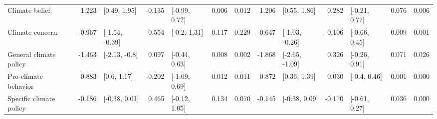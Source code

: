 \documentclass[
  letterpaper,
  DIV=11,
  numbers=noendperiod]{scrartcl}
\begin{document}
\begin{table}
{\begin{tabular*}{\linewidth}{@{\extracolsep{\fill}}lrlrlrrrlrlrr}
\midrule\addlinespace[2.5pt]
\multicolumn{13}{l}{{\bfseries Tertiary}} \\[2.5pt] 
\midrule\addlinespace[2.5pt]
Climate belief & 1.223 & [0.49, 1.95] & -0.135 & [-0.99, 0.72] & 0.006 & 0.012 & 1.206 & [0.55, 1.86] & 0.282 & [-0.21, 0.77] & 0.076 & 0.006 \\ 
Climate concern & -0.967 & [-1.54, -0.39] & 0.554 & [-0.2, 1.31] & 0.117 & 0.229 & -0.647 & [-1.03, -0.26] & -0.106 & [-0.66, 0.45] & 0.009 & 0.001 \\ 
General climate policy & -1.463 & [-2.13, -0.8] & 0.097 & [-0.44, 0.63] & 0.008 & 0.002 & -1.868 & [-2.65, -1.09] & 0.326 & [-0.26, 0.91] & 0.071 & 0.026 \\ 
Pro-climate behavior & 0.883 & [0.6, 1.17] & -0.202 & [-1.09, 0.69] & 0.012 & 0.011 & 0.872 & [0.36, 1.39] & 0.030 & [-0.4, 0.46] & 0.001 & 0.000 \\ 
Specific climate policy & -0.186 & [-0.38, 0.01] & 0.465 & [-0.12, 1.05] & 0.134 & 0.070 & -0.145 & [-0.38, 0.09] & -0.170 & [-0.61, 0.27] & 0.036 & 0.000 \\ 
\bottomrule
\end{tabular*}

}

\end{table}%
\end{document}
